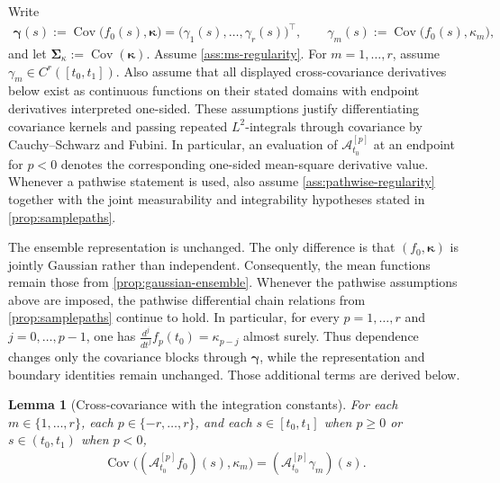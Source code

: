 \documentclass[11pt,a4paper]{article}
\newtheorem{lemma}[theorem]{Lemma}
\theoremstyle{definition}
\theoremstyle{remark}
\DeclareMathOperator{\Cov}{Cov}
\begin{document}
Write
\begin{align*}
\boldsymbol{\gamma}(s):=\Cov\bigl(f_0(s),\boldsymbol{\kappa}\bigr)=\bigl(\gamma_1(s),\ldots,\gamma_r(s)\bigr)^\top,
\qquad
\gamma_m(s):=\Cov\bigl(f_0(s),\kappa_m\bigr),
\end{align*}
and let \(\boldsymbol{\Sigma}_{\kappa}:=\Cov(\boldsymbol{\kappa})\). Assume \cref{ass:ms-regularity}. For \(m=1,\ldots,r\), assume \(\gamma_m\in C^r([t_0,t_1])\). Also assume that all displayed cross-covariance derivatives below exist as continuous functions on their stated domains with endpoint derivatives interpreted one-sided. These assumptions justify differentiating covariance kernels and passing repeated \(L^2\)-integrals through covariance by Cauchy--Schwarz and Fubini. In particular, an evaluation of \(\mathcal A_{t_0}^{[p]}\) at an endpoint for \(p<0\) denotes the corresponding one-sided mean-square derivative value. Whenever a pathwise statement is used, also assume \cref{ass:pathwise-regularity} together with the joint measurability and integrability hypotheses stated in \cref{prop:samplepaths}.

The ensemble representation is unchanged. The only difference is that \((f_0,\boldsymbol{\kappa})\) is jointly Gaussian rather than independent. Consequently, the mean functions remain those from \cref{prop:gaussian-ensemble}. Whenever the pathwise assumptions above are imposed, the pathwise differential chain relations from \cref{prop:samplepaths} continue to hold. In particular, for every \(p=1,\ldots,r\) and \(j=0,\ldots,p-1\), one has \(\frac{d^j}{dt^j}f_p(t_0)=\kappa_{p-j}\) almost surely. Thus dependence changes only the covariance blocks through \(\boldsymbol{\gamma}\), while the representation and boundary identities remain unchanged. Those additional terms are derived below.

\begin{lemma}[Cross-covariance with the integration constants]\label{lem:appendix-cross-basic}
For each \(m\in\{1,\ldots,r\}\), each \(p\in\{-r,\ldots,r\}\), and each \(s\in[t_0,t_1]\) when \(p\ge 0\) or \(s\in(t_0,t_1)\) when \(p<0\),
\begin{align*}
\Cov\bigl((\mathcal A_{t_0}^{[p]}f_0)(s),\kappa_m\bigr)=(\mathcal A_{t_0}^{[p]}\gamma_m)(s).
\end{align*}
\end{lemma}
\end{document}
